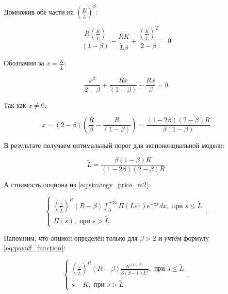 \documentclass[a4paper,12pt]{article}
\theoremstyle{definition}
\begin{document}
Домножив обе части на $\left(\frac{K}{\tilde{L}}\right)^{\beta}$:

\begin{equation*}
    \frac{R \left(\frac{K}{\tilde{L}}\right)}{(1 - \beta)} - \frac{R K}{\tilde{L} \beta} + \frac{\left(\frac{K}{\tilde{L}}\right)^2}{2 - \beta} = 0
\end{equation*}

Обозначим за $x = \frac{K}{\tilde{L}}$:

\begin{equation*}
     \frac{x^2}{2 - \beta} + \frac{R x}{(1 - \beta)} - \frac{R x}{\beta} = 0
\end{equation*}

Так как $x \neq 0$:

\begin{equation*}
     x = (2 - \beta) \left(\frac{R}{\beta} - \frac{R}{(1 - \beta)}\right) = \frac{(1 - 2 \beta) (2 - \beta) R}{\beta (1 - \beta)}
\end{equation*}

В результате получаем оптимальный порог для экспоненциальной модели:

\begin{equation*}
    \tilde{L} = \frac{\beta (1 - \beta) K}{(1 - 2 \beta) (2 - \beta) R}
\end{equation*}

А стоимость опциона из \eqref{eq:strategy_price_m2}:

\begin{equation*}
\begin{cases}
    \left(\frac{s}{\widetilde{L}}\right)^R (R - \beta) \int_{0}^{+\infty} \Pi(L e^x) e^{-\beta x} dx, \text{ при } s \le \widetilde{L}\\
    \Pi(s), \text{ при } s > \widetilde{L}
\end{cases}\,.
\end{equation*}

Напомним, что опцион определён только для $\beta > 2$ и учтём формулу \eqref{eq:payoff_function}:

\begin{equation*}
\begin{cases}
    \left(\frac{s}{\widetilde{L}}\right)^R (R - \beta) \frac{K^{(1-\beta)}}{\beta (\beta - 1) L^{\beta}}, \text{ при } s \le \widetilde{L}\\
    s - K, \text{ при } s > \widetilde{L}
\end{cases}\,.
\end{equation*}
\end{document}
